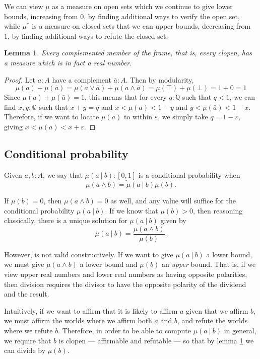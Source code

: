 \documentclass{article}           %
\newtheorem{lemma}{Lemma}
\newcommand{\suchthat}{\ |\ }
\begin{document}
We can view $\mu$ as a measure on open sets which we continue to give lower bounds, increasing from 0, by finding additional ways to verify the open set, while $\mu^*$ is a measure on closed sets that we can upper bounds, decreasing from 1, by finding additional ways to refute the closed set.

\begin{lemma}
\label{comp-real}
Every complemented member of the frame, that is, every clopen, has a measure which is in fact a real number.
\end{lemma}
\begin{proof}
Let $a : A$ have a complement $\bar{a} : A$. Then by modularity, 
\[
\mu(a) + \mu(\bar{a}) = \mu(a \vee \bar{a}) + \mu(a \wedge \bar{a}) = \mu(\top) + \mu(\bot) = 1 + 0 = 1
\]
Since $\mu(a) + \mu(\bar{a}) = 1$, this means that for every $q : \mathbb{Q}$ such that $q < 1$, we can find $x, y : \mathbb{Q}$ such that $x + y = q$ and $x < \mu(a) < 1 - y$ and $y < \mu(\bar{a}) < 1 - x$. Therefore, if we want to locate $\mu(a)$ to within $\varepsilon$, we simply take $q = 1 - \varepsilon$, giving $x < \mu(a) < x + \varepsilon$.
\end{proof}

\subsection{Conditional probability}

Given $a, b : A$, we say that $\mu(a \suchthat b) : \underline{[0,1]}$ is a conditional probability when
\[
\mu(a \wedge b) = \mu(a \suchthat b) \mu(b).
\]

If $\mu(b) = 0$, then $\mu(a \wedge b) = 0$ as well, and any value will suffice for the conditional probability $\mu(a \suchthat b)$. If we know that $\mu(b) > 0$, then reasoning classically, there is a unique solution for $\mu(a \suchthat b)$ given by
\[
\mu(a \suchthat b) = \frac{\mu(a \wedge b)}{\mu(b)}.
\]

However, is not valid constructively. If we want to give $\mu(a \suchthat b)$ a lower bound, we must give $\mu(a \wedge b)$ a lower bound and $\mu(b)$ an \emph{upper} bound. That is, if we view upper real numbers and lower real numbers as having opposite polarities, then division requires the divisor to have the opposite polarity of the dividend and the result.

Intuitively, if we want to affirm that it is likely to affirm $a$ given that we affirm $b$, we must affirm the worlds where we affirm both $a$ and $b$, and refute the worlds where we refute $b$. Therefore, in order to be able to compute $\mu(a \suchthat b)$ in general, we require that $b$ is clopen --- affirmable and refutable --- so that by lemma \ref{comp-real} we can divide by $\mu(b)$.
\end{document}
